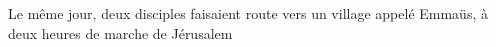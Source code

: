 Le même jour, deux disciples faisaient route vers un village appelé Emmaüs, à deux heures de marche de Jérusalem